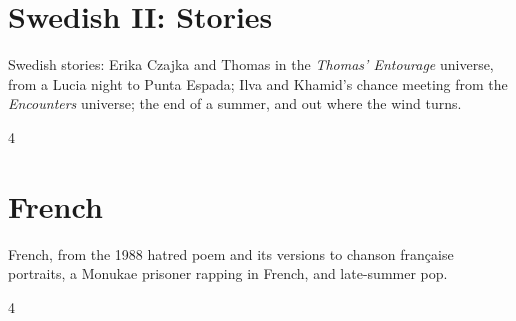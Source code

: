 \documentclass[a4paper,landscape]{memoir}
\begin{document}
\chapter{Swedish II: Stories}
Swedish stories: Erika Czajka and Thomas in the \emph{Thomas' Entourage} universe, from a Lucia night to Punta Espada; Ilva and Khamid's chance meeting from the \emph{Encounters} universe; the end of a summer, and out where the wind turns.
\clearpage\begin{multicols*}{4}
\end{multicols*}

\chapter{French}
French, from the 1988 hatred poem and its versions to chanson française portraits, a Monukae prisoner rapping in French, and late-summer pop.
\clearpage\begin{multicols*}{4}
\end{multicols*}
\end{document}
